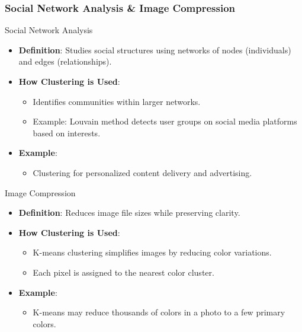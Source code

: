 \documentclass{beamer}
\begin{document}
\begin{frame}[fragile]
    \frametitle{Social Network Analysis \& Image Compression}
    \begin{block}{Social Network Analysis}
        \begin{itemize}
            \item \textbf{Definition}: Studies social structures using networks of nodes (individuals) and edges (relationships).
            \item \textbf{How Clustering is Used}:
            \begin{itemize}
                \item Identifies communities within larger networks.
                \item Example: Louvain method detects user groups on social media platforms based on interests.
            \end{itemize}
            \item \textbf{Example}:
            \begin{itemize}
                \item Clustering for personalized content delivery and advertising.
            \end{itemize}
        \end{itemize}
    \end{block}

    \begin{block}{Image Compression}
        \begin{itemize}
            \item \textbf{Definition}: Reduces image file sizes while preserving clarity.
            \item \textbf{How Clustering is Used}:
            \begin{itemize}
                \item K-means clustering simplifies images by reducing color variations.
                \item Each pixel is assigned to the nearest color cluster.
            \end{itemize}
            \item \textbf{Example}:
            \begin{itemize}
                \item K-means may reduce thousands of colors in a photo to a few primary colors.
            \end{itemize}
        \end{itemize}
    \end{block}
\end{frame}
\end{document}
